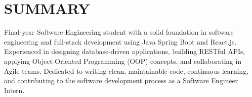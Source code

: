 \section{SUMMARY}
\noindent Final-year Software Engineering student with a solid foundation in software engineering and full-stack development using Java Spring Boot and React.js. Experienced in designing database-driven applications, building RESTful APIs, applying Object-Oriented Programming (OOP) concepts, and collaborating in Agile teams. Dedicated to writing clean, maintainable code, continuous learning, and contributing to the software development process as a Software Engineer Intern.
